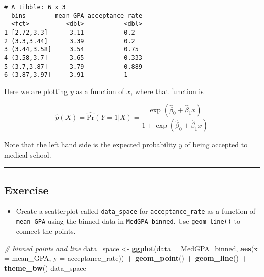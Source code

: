 \documentclass[
]{book}
\newenvironment{Shaded}{\begin{snugshade}}{\end{snugshade}}
\newcommand{\CommentTok}[1]{\textcolor[rgb]{0.56,0.35,0.01}{\textit{#1}}}
\newcommand{\DataTypeTok}[1]{\textcolor[rgb]{0.13,0.29,0.53}{#1}}
\newcommand{\KeywordTok}[1]{\textcolor[rgb]{0.13,0.29,0.53}{\textbf{#1}}}
\newcommand{\NormalTok}[1]{#1}
\newcommand{\OperatorTok}[1]{\textcolor[rgb]{0.81,0.36,0.00}{\textbf{#1}}}
\newcommand{\StringTok}[1]{\textcolor[rgb]{0.31,0.60,0.02}{#1}}
\providecommand{\tightlist}{%
  \setlength{\itemsep}{0pt}\setlength{\parskip}{0pt}}
\begin{document}
\begin{verbatim}
# A tibble: 6 x 3
  bins        mean_GPA acceptance_rate
  <fct>          <dbl>           <dbl>
1 [2.72,3.3]      3.11           0.2  
2 (3.3,3.44]      3.39           0.2  
3 (3.44,3.58]     3.54           0.75 
4 (3.58,3.7]      3.65           0.333
5 (3.7,3.87]      3.79           0.889
6 (3.87,3.97]     3.91           1    
\end{verbatim}

Here we are plotting \(y\) as a function of \(x\), where that function is

\begin{equation}
\hat{p}(X) = \widehat{\text{Pr}}(Y=1|X) = \frac{\exp(\hat{\beta}_0 + \hat{\beta}_1 x)}{1 + \exp(\hat{\beta}_0 + \hat{\beta}_1 x)}
\end{equation}

Note that the left hand side is the expected probability \(y\) of being accepted to medical school.

\begin{center}\rule{0.5\linewidth}{0.5pt}\end{center}

\hypertarget{exercise-16}{%
\subsection*{Exercise}\label{exercise-16}}

\begin{itemize}
\tightlist
\item
  Create a scatterplot called \texttt{data\_space} for \texttt{acceptance\_rate} as a function of \texttt{mean\_GPA} using the binned data in \texttt{MedGPA\_binned}. Use \texttt{geom\_line()} to connect the points.
\end{itemize}

\begin{Shaded}
\begin{Highlighting}[]
\CommentTok{# binned points and line}
\NormalTok{data_space <-}\StringTok{ }\KeywordTok{ggplot}\NormalTok{(}\DataTypeTok{data =}\NormalTok{ MedGPA_binned, }\KeywordTok{aes}\NormalTok{(}\DataTypeTok{x =}\NormalTok{ mean_GPA, }\DataTypeTok{y =}\NormalTok{ acceptance_rate)) }\OperatorTok{+}
\StringTok{  }\KeywordTok{geom_point}\NormalTok{() }\OperatorTok{+}\StringTok{ }
\StringTok{  }\KeywordTok{geom_line}\NormalTok{() }\OperatorTok{+}\StringTok{ }
\StringTok{  }\KeywordTok{theme_bw}\NormalTok{()}
\NormalTok{data_space}
\end{Highlighting}
\end{Shaded}
\end{document}
